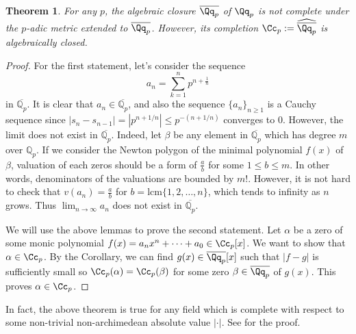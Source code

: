 \documentclass{article}
\newtheorem{theorem}{Theorem}
\begin{document}
\begin{theorem}
For any $p$, the algebraic closure $\overline{\Qq_{p}}$ of $\Qq_{p}$ is not complete under the $p$-adic metric extended to $\overline{\Qq_{p}}$. However, its completion $\Cc_{p} :=\widehat{\overline{\Qq_{p}}}$ is algebraically closed. 
\end{theorem}
\begin{proof}
For the first statement, let's consider the sequence
$$
a_{n} = \sum_{k=1}^{n} p^{n + \frac{1}{n}}
$$
in $\overline{\mathbb{Q}_{p}}$. 
It is clear that $a_{n} \in \overline{\mathbb{Q}_{p}}$, and also the sequence $\{a_{n}\}_{n\geq 1}$ is a Cauchy sequence since $|s_{n} - s_{n-1}| = |p^{n+1/n}| \leq p^{-(n+1/n)}$ converges to 0. 
However, the limit does not exist in $\overline{\mathbb{Q}_{p}}$. 
Indeed, let $\beta$ be any element in $\overline{\mathbb{Q}_p}$ which has degree $m$ over $\mathbb{Q}_p$. 
If we consider the Newton polygon of the minimal polynomial $f(x)$ of $\beta$, 
valuation of each zeros should be a form of $\frac{a}{b}$ for some $1\leq b \leq m$. 
In other words, denominators of the valuations are bounded by $m!$. 
However, it is not hard to check that $v(a_n) = \frac{a}{b}$ for $b = \mathrm{lcm}\{1, 2, \dots, n\}$, which tends to infinity as $n$ grows. 
Thus $\lim_{n\to \infty} a_n$ does not exist in $\overline{\mathbb{Q}_{p}}$. 

We will use the above lemmas to prove the second statement. 
Let $\alpha$ be a zero of some monic polynomial $f(x) = a_{n}x^{n} + \cdots + a_{0} \in \Cc_p[x]$. 
We want to show that $\alpha\in \Cc_p$. 
By the Corollary, we can find $g(x) \in \overline{\Qq_{p}}[x]$ such that $|f-g|$ is sufficiently small so $\Cc_{p}(\alpha) = \Cc_{p}(\beta)$ for some zero $\beta \in \overline{\Qq_p}$ of $g(x)$. 
This proves $\alpha \in \Cc_{p}$. 
\end{proof}
In fact, the above theorem is true for any field which is complete with respect to some non-trivial non-archimedean absolute value $|\cdot |$. See \cite{co} for the proof.
\end{document}
